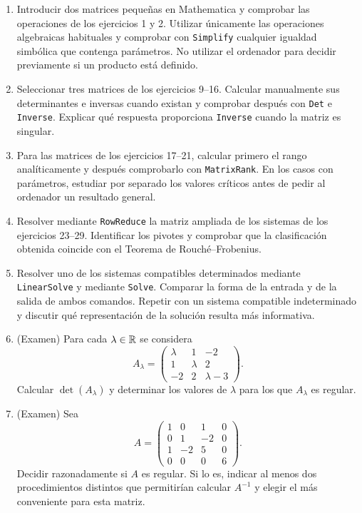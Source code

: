 \begin{enumerate}[label=\textbf{\arabic*.},leftmargin=*]
\item \M Introducir dos matrices pequeñas en Mathematica y comprobar las operaciones de los ejercicios 1 y 2. Utilizar únicamente las operaciones algebraicas habituales y comprobar con \texttt{Simplify} cualquier igualdad simbólica que contenga parámetros. No utilizar el ordenador para decidir previamente si un producto está definido.

\item \M Seleccionar tres matrices de los ejercicios 9--16. Calcular manualmente sus determinantes e inversas cuando existan y comprobar después con \texttt{Det} e \texttt{Inverse}. Explicar qué respuesta proporciona \texttt{Inverse} cuando la matriz es singular.

\item \M Para las matrices de los ejercicios 17--21, calcular primero el rango analíticamente y después comprobarlo con \texttt{MatrixRank}. En los casos con parámetros, estudiar por separado los valores críticos antes de pedir al ordenador un resultado general.

\item \M Resolver mediante \texttt{RowReduce} la matriz ampliada de los sistemas de los ejercicios 23--29. Identificar los pivotes y comprobar que la clasificación obtenida coincide con el Teorema de Rouché--Frobenius.

\item \M Resolver uno de los sistemas compatibles determinados mediante \texttt{LinearSolve} y mediante \texttt{Solve}. Comparar la forma de la entrada y de la salida de ambos comandos. Repetir con un sistema compatible indeterminado y discutir qué representación de la solución resulta más informativa.

\item (Examen) Para cada $\lambda\in\mathbb{R}$ se considera
\[
A_\lambda=
\begin{pmatrix}
\lambda&1&-2\\
1&\lambda&2\\
-2&2&\lambda-3
\end{pmatrix}.
\]
Calcular $\det(A_\lambda)$ y determinar los valores de $\lambda$ para los que $A_\lambda$ es regular.

\item (Examen) Sea
\[
A=
\begin{pmatrix}
1&0&1&0\\
0&1&-2&0\\
1&-2&5&0\\
0&0&0&6
\end{pmatrix}.
\]
Decidir razonadamente si $A$ es regular. Si lo es, indicar al menos dos procedimientos distintos que permitirían calcular $A^{-1}$ y elegir el más conveniente para esta matriz.


\end{enumerate}
